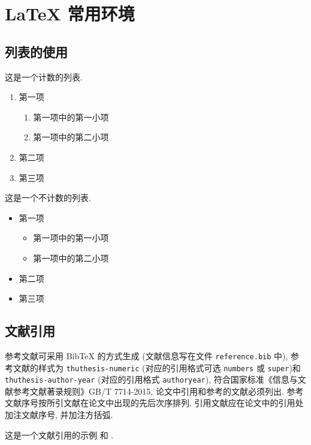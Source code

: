 

\chapter{LaTeX 常用环境}

\section{列表的使用}

这是一个计数的列表.
\begin{enumerate}%
  \item 第一项
    \begin{enumerate}
      \item 第一项中的第一小项
      \item 第一项中的第二小项
    \end{enumerate}
  \item 第二项
  \item 第三项
\end{enumerate}

这是一个不计数的列表.
\begin{itemize}%
  \item 第一项
  \begin{itemize}
    \item 第一项中的第一小项
    \item 第一项中的第二小项
  \end{itemize}
  \item 第二项
  \item 第三项
\end{itemize}


\section{文献引用}

参考文献可采用 BibTeX 的方式生成 (文献信息写在文件 \verb|reference.bib| 中), 参考文献的样式为 \verb|thuthesis-numeric| (对应的引用格式可选 \verb|numbers| 或  \verb|super|)和 \verb|thuthesis-author-year| (对应的引用格式 \verb|authoryear|), 符合国家标准《信息与文献参考文献著录规则》GB/T 7714-2015, 论文中引用和参考的文献必须列出. 参考文献序号按所引文献在论文中出现的先后次序排列. 引用文献应在论文中的引用处加注文献序号, 并加注方括弧.

这是一个文献引用的示例 \cite{Tadmor2012} 和 \cite{LiLiu1997,Adams2003,TreWei2014}.


